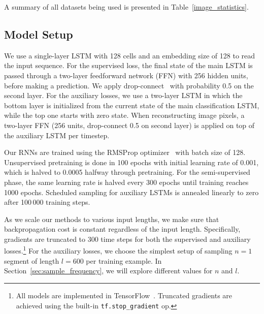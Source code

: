 \documentclass{article}
\begin{document}
A summary of all datasets being used is presented in Table~\ref{image_statistics}.

\subsection{Model Setup}
We use a single-layer LSTM with 128 cells and an embedding size of 128 to read the input sequence. 
For the supervised loss, the final state of the main LSTM is passed through a two-layer feedforward network (FFN) with 256 hidden units, before making a prediction. We apply drop-connect~\cite{wan2013regularization} with probability 0.5 on the second layer. For the auxiliary losses, we use a two-layer LSTM in which the bottom layer is initialized from the current state of the main classification LSTM, while the top one starts with zero state. When reconstructing image pixels, a two-layer FFN (256 units, drop-connect 0.5 on second layer) is applied on top of the auxiliary LSTM per timestep.

Our RNNs are trained using the RMSProp optimizer~\cite{Tieleman2012} with batch size of 128. Unsupervised pretraining is done in 100 epochs with initial learning rate of 0.001, which is halved to 0.0005 halfway through pretraining. For the semi-supervised phase, the same learning rate is halved every 300 epochs until training reaches 1000 epochs. Scheduled sampling for auxiliary LSTMs is annealed linearly to zero after 100\,000 training steps.

As we scale our methods to various input lengths, we make sure that backpropagation cost is constant regardless of the input length. Specifically, gradients are truncated to 300 time steps for both the supervised and auxiliary losses.\footnote{All models are implemented in TensorFlow~\cite{tensorflow2015-whitepaper}. Truncated gradients are achieved using the built-in \texttt{tf.stop\_gradient} op.}
For the auxiliary losses, we choose the simplest setup of sampling $n{=}1$ segment of length $l{=}600$ per training example. In Section~\ref{sec:sample_frequency}, we will explore different values for $n$ and $l$.
\end{document}
